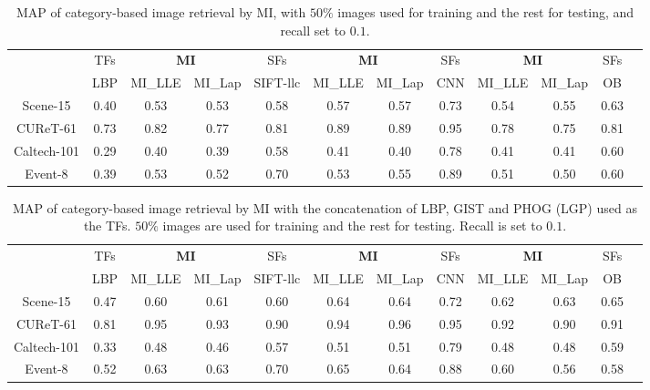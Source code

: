 \documentclass[10pt,twocolumn,letterpaper]{article}
\begin{document}
  
\begin{table}[!tb]
  \centering \small    \setlength{\tabcolsep}{.60em} 
  \caption{MAP of category-based image retrieval by MI, with $50\%$ images used for training and the rest for testing, and recall set to $0.1$.}
  \begin{tabular}{c|c|ccc|ccc|cccc}
   & TFs & \multicolumn{2}{c}{\textbf{MI}} & SFs & \multicolumn{2}{c}{ \textbf{MI} } & SFs & \multicolumn{2}{c}{ \textbf{MI}} & SFs  \\   
    & LBP & MI\_LLE & MI\_Lap & SIFT-llc  & MI\_LLE & MI\_Lap & CNN &  MI\_LLE & MI\_Lap & OB     \\   \hline  
   Scene-15  & 0.40  & 0.53  & 0.53  & 0.58   & 0.57  & 0.57  & 0.73    & 0.54  & 0.55  & 0.63 \\ 
   CUReT-61  & 0.73 & 0.82  & 0.77  & 0.81    & 0.89  & 0.89  & 0.95   & 0.78  & 0.75  & 0.81 \\ 
   Caltech-101  & 0.29  & 0.40  & 0.39  & 0.58   & 0.41  & 0.40  & 0.78  & 0.41 & 0.41 & 0.60 \\ 
   Event-8 & 0.39  & 0.53  & 0.52  & 0.70    & 0.53  & 0.55  & 0.89    & 0.51  & 0.50  & 0.60 \\   
  \end{tabular}
  \label{tab:class:retreval} 
\end{table}




 \begin{table}[!tb]
   \centering \small  \setlength{\tabcolsep}{.60em} 
\caption{MAP of category-based image retrieval by MI with the concatenation of LBP, GIST and PHOG (LGP) used as the TFs. 
    $50\%$ images are used for training and the rest for testing. Recall is set to $0.1$.}
  \begin{tabular}{c|c|ccc|ccc|cccc}
   & TFs & \multicolumn{2}{c}{\textbf{MI}} & SFs & \multicolumn{2}{c}{ \textbf{MI} } & SFs & \multicolumn{2}{c}{ \textbf{MI}} & SFs  \\   
    & LBP & MI\_LLE & MI\_Lap & SIFT-llc  & MI\_LLE & MI\_Lap & CNN &  MI\_LLE & MI\_Lap & OB     \\   \hline  
      Scene-15 & 0.47  & 0.60  & 0.61  & 0.60   & 0.64  & 0.64  & 0.72   & 0.62  & 0.63  & 0.65 \\ 
      CUReT-61 & 0.81  & 0.95  & 0.93  & 0.90    & 0.94  & 0.96  & 0.95    & 0.92  & 0.90  & 0.91 \\ 
      Caltech-101 & 0.33  & 0.48  & 0.46  & 0.57   & 0.51  & 0.51  & 0.79  & 0.48  & 0.48  & 0.59 \\ 
     Event-8 & 0.52  & 0.63  & 0.63  & 0.70  & 0.65  & 0.64  & 0.88   & 0.60  & 0.56  & 0.58 \\    
  \end{tabular}
     \label{tab:alltf}
 \end{table}
\end{document}
